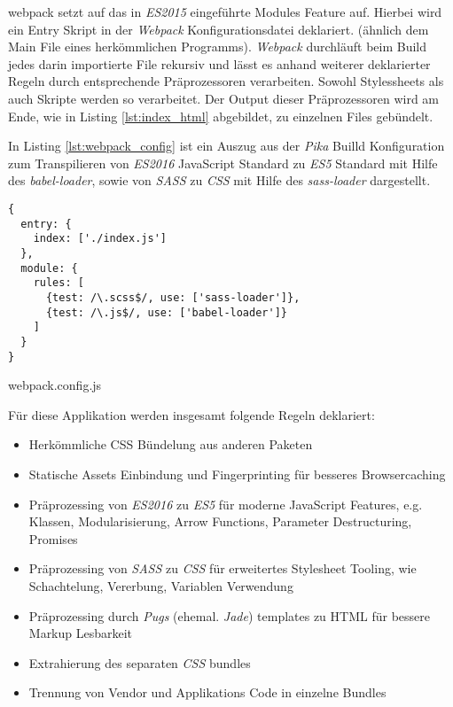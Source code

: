 \gls{webpack} setzt auf das in \textit{ES2015} eingeführte Modules Feature auf. 
Hierbei wird ein Entry Skript in der \textit{Webpack} Konfigurationsdatei deklariert. (ähnlich dem Main File eines herkömmlichen Programms). \textit{Webpack} durchläuft beim Build jedes darin importierte File rekursiv und lässt es anhand weiterer deklarierter Regeln durch entsprechende Präprozessoren verarbeiten. Sowohl Stylessheets als auch Skripte werden so verarbeitet. Der Output dieser Präprozessoren wird am Ende, wie in Listing \ref{lst:index_html} abgebildet, zu einzelnen Files gebündelt.

In Listing \ref{lst:webpack_config} ist ein Auszug aus der \textit{Pika} Builld Konfiguration zum Transpilieren von  \textit{ES2016} JavaScript Standard zu \textit{ES5} Standard mit Hilfe des \textit{babel-loader}, sowie von  \textit{SASS} zu \textit{CSS} mit Hilfe des \textit{sass-loader} dargestellt.

\begin{listing}[H]
\begin{verbatim}
{
  entry: {
    index: ['./index.js']
  },
  module: {
    rules: [
      {test: /\.scss$/, use: ['sass-loader']},
      {test: /\.js$/, use: ['babel-loader']}
    ]
  }
}
\end{verbatim}
\caption{webpack.config.js}
\label{lst:webpack_config}
\end{listing}

Für diese Applikation werden insgesamt folgende Regeln deklariert:

\begin{itemize}
 \item Herkömmliche CSS Bündelung aus anderen Paketen
 \item Statische Assets Einbindung und Fingerprinting für besseres Browsercaching
 \item Präprozessing von \textit{ES2016} zu \textit{ES5} für moderne JavaScript Features, e.g. Klassen, Modularisierung, Arrow Functions, Parameter Destructuring, Promises   
 \item Präprozessing von \textit{SASS} zu \textit{CSS} für erweitertes Stylesheet Tooling, wie Schachtelung, Vererbung, Variablen Verwendung
 \item Präprozessing durch \textit{Pugs} (ehemal. \textit{Jade}) templates zu HTML für bessere Markup Lesbarkeit
 \item Extrahierung des separaten \textit{CSS} bundles
 \item Trennung von Vendor und Applikations Code in einzelne Bundles
\end{itemize}

